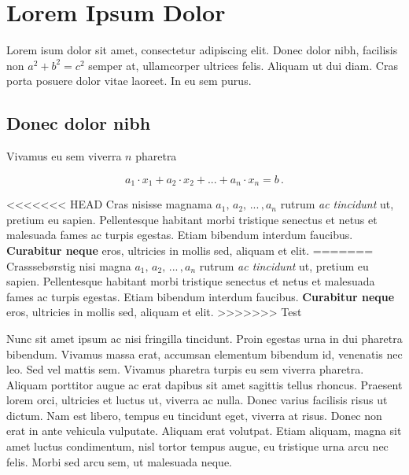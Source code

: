 

\setcounter{chapter}{0} 

\chapter{Lorem Ipsum Dolor} \label{mychapter}

Lorem isum dolor sit amet, consectetur adipiscing elit. Donec dolor nibh, facilisis non $a^2 + b^2 = c^2$ semper at, ullamcorper ultrices felis. Aliquam ut dui diam. Cras porta posuere dolor vitae laoreet. In eu sem purus. 

\section{Donec dolor nibh}
\label{myfirstsection}

Vivamus  eu sem viverra $n$ pharetra

\begin{equation} \label{myeq.1}
a_1\cdot x_1+a_2\cdot x_2+...+a_n\cdot x_n=b\,.
\end{equation}

<<<<<<< HEAD
Cras nisisse magnama $a_1,\,a_2,\,...\,,a_n$ rutrum \textit{ac tincidunt} ut, pretium eu sapien. Pellentesque habitant morbi tristique senectus et netus et malesuada fames ac turpis egestas. Etiam bibendum interdum faucibus. \textbf{Curabitur neque} eros, ultricies in mollis sed, aliquam et elit. 
=======
Crasssebørstig nisi magna $a_1,\,a_2,\,...\,,a_n$ rutrum \textit{ac tincidunt} ut, pretium eu sapien. Pellentesque habitant morbi tristique senectus et netus et malesuada fames ac turpis egestas. Etiam bibendum interdum faucibus. \textbf{Curabitur neque} eros, ultricies in mollis sed, aliquam et elit. 
>>>>>>> Test

Nunc sit amet ipsum ac nisi fringilla tincidunt. Proin egestas urna in dui pharetra bibendum. Vivamus massa erat, accumsan elementum bibendum id, venenatis nec leo. Sed vel mattis sem. Vivamus pharetra turpis eu sem viverra pharetra. Aliquam porttitor augue ac erat dapibus sit amet sagittis tellus rhoncus. Praesent lorem orci, ultricies et luctus ut, viverra ac nulla. Donec varius facilisis risus ut dictum. Nam est libero, tempus eu tincidunt eget, viverra at risus. Donec non erat in ante vehicula vulputate. Aliquam erat volutpat. Etiam aliquam, magna sit amet luctus condimentum, nisl tortor tempus augue, eu tristique urna arcu nec felis. Morbi sed arcu sem, ut malesuada neque.

